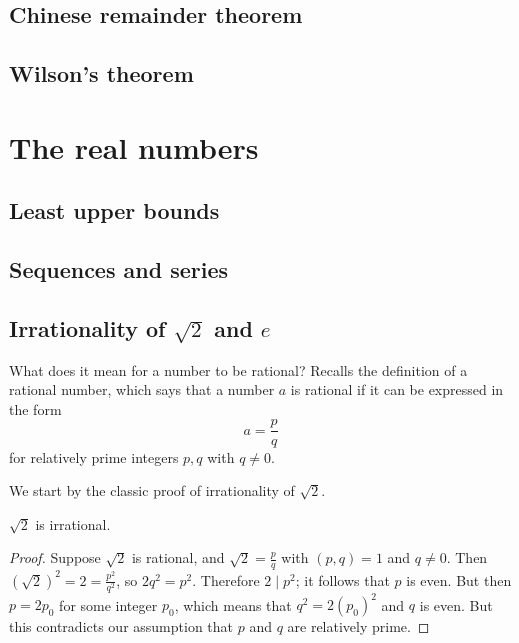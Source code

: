 \documentclass[main.tex]{subfiles}
\begin{document}
		\subsection{Chinese remainder theorem}
		
		\subsection{Wilson's theorem}
		
	\section{The real numbers}
		\subsection{Least upper bounds}
		
		\subsection{Sequences and series}
		
		\subsection{Irrationality of $\sqrt{2}$ and $e$}
		What does it mean for a number to be rational? Recalls the definition of a rational number, which says that a number $a$ is rational if it can be expressed in the form
		\begin{equation*}
			a = \frac{p}{q}
		\end{equation*}
		for relatively prime integers $p, q$ with $q \neq 0$.
		
		We start by the classic proof of irrationality of $\sqrt{2}$.
		\begin{theorem}
			$\sqrt{2}$ is irrational.
		\end{theorem}
		\begin{proof}
			Suppose $\sqrt{2}$ is rational, and $\sqrt{2} = \frac{p}{q}$ with $(p, q) = 1$ and $q \neq 0$. Then $(\sqrt{2})^2 = 2 = \frac{p^2}{q^2}$, so $2q^2 = p^2$. Therefore $2 \mid p^2$; it follows that $p$ is even. But then $p = 2p_0$ for some integer $p_0$, which means that $q^2 = 2{(p_0)}^2$ and $q$ is even. But this contradicts our assumption that $p$ and $q$ are relatively prime.
		\end{proof}
	
\end{document}
